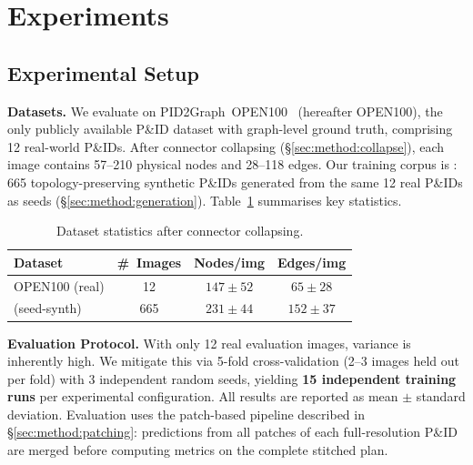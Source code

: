 
\section{Experiments}
\label{sec:experiments}

\subsection{Experimental Setup}
\label{sec:exp:setup}

\noindent\textbf{Datasets.}
We evaluate on PID2Graph~OPEN100~\cite{sturmer2025} (hereafter OPEN100),
the only publicly available P\&ID dataset with graph-level ground truth,
comprising 12 real-world P\&IDs.
After connector collapsing (\S\ref{sec:method:collapse}), each image
contains 57--210 physical nodes and 28--118 edges.
Our training corpus is \ours{}: 665 topology-preserving synthetic P\&IDs
generated from the same 12 real P\&IDs as seeds
(\S\ref{sec:method:generation}).
Table~\ref{tab:dataset_stats} summarises key statistics.

\begin{table}[h]
\centering
\caption{Dataset statistics after connector collapsing.}
\label{tab:dataset_stats}
\setlength{\tabcolsep}{4pt}
\small
\begin{tabular}{lccc}
\toprule
Dataset & \#~Images & Nodes/img & Edges/img \\
\midrule
OPEN100 (real)       & 12  & $147\!\pm\!52$ & $65\!\pm\!28$  \\
\ours{} (seed-synth) & 665 & $231\!\pm\!44$ & $152\!\pm\!37$ \\
\bottomrule
\end{tabular}
\end{table}

\noindent\textbf{Evaluation Protocol.}
With only 12 real evaluation images, variance is inherently high.
We mitigate this via 5-fold cross-validation (2--3 images held out per
fold) with 3 independent random seeds, yielding \textbf{15 independent
training runs} per experimental configuration.
All results are reported as mean $\pm$ standard deviation.
Evaluation uses the patch-based pipeline described in
\S\ref{sec:method:patching}: predictions from all patches of each
full-resolution P\&ID are merged before computing metrics on the
complete stitched plan.

